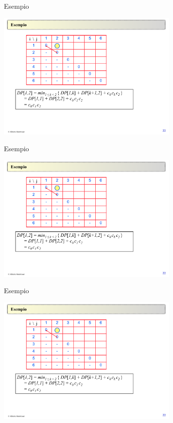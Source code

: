 \begin{frame}{Esempio}
\vspace{-12pt}
\begin{center}
\includegraphics[width=9cm,page=1]{moltmatrici.pdf}
\end{center}
\end{frame}

\begin{frame}{Esempio}
\vspace{-12pt}
\begin{center}
\includegraphics[width=9cm,page=2]{moltmatrici.pdf}
\end{center}
\end{frame}

\begin{frame}{Esempio}
\vspace{-12pt}
\begin{center}
\includegraphics[width=9cm,page=3]{moltmatrici.pdf}
\end{center}
\end{frame}

